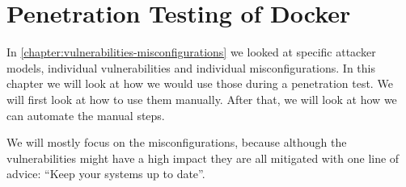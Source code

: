 \chapter{Penetration Testing of Docker}\label{chapter:pentesting}
In \autoref{chapter:vulnerabilities-misconfigurations} we looked at specific attacker models, individual vulnerabilities and individual misconfigurations. In this chapter we will look at how we would use those during a penetration test. We will first look at how to use them manually. After that, we will look at how we can automate the manual steps.

\hfill

We will mostly focus on the misconfigurations, because although the vulnerabilities might have a high impact they are all mitigated with one line of advice: ``Keep your systems up to date''.




